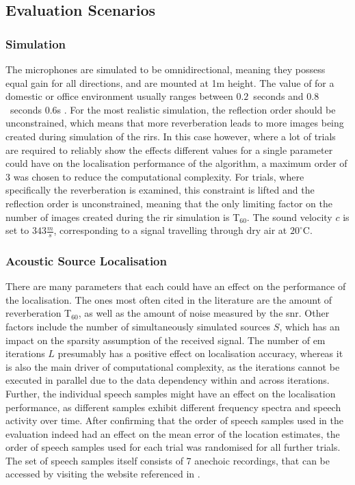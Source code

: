 \subsection{Evaluation Scenarios}
\subsubsection*{Simulation}
The microphones are simulated to be omnidirectional, meaning they possess equal gain for all directions, and are mounted at 1m height. The value of \Tsixty for a domestic or office environment usually ranges between $0.2$~seconds and $0.8$~seconds 0.6s \cite[p.~695]{Gannot2017}. For the most realistic simulation, the reflection order should be unconstrained, which means that more reverberation leads to more images being created during simulation of the \glspl{rir}. In this case however, where a lot of trials are required to reliably show the effects different values for a single parameter could have on the localisation performance of the algorithm, a maximum order of 3 was chosen to reduce the computational complexity. For trials, where specifically the reverberation is examined, this constraint is lifted and the reflection order is unconstrained, meaning that the only limiting factor on the number of images created during the \gls{rir} simulation is T$_{60}$. The sound velocity $c$ is set to $343\frac{m}{s}$, corresponding to a signal travelling through dry air at $20^{\circ}$C.

\subsubsection*{Acoustic Source Localisation}
\label{sec:evalScenariosLoc}
There are many parameters that each could have an effect on the performance of the localisation. The ones most often cited in the literature are the amount of reverberation T$_{60}$, as well as the amount of noise measured by the \gls{snr}. Other factors include the number of simultaneously simulated sources $S$, which has an impact on the sparsity assumption of the received signal. The number of \gls{em} iterations $L$ presumably has a positive effect on localisation accuracy, whereas it is also the main driver of computational complexity, as the iterations cannot be executed in parallel due to the data dependency within and across iterations. Further, the individual speech samples might have an effect on the localisation performance, as different samples exhibit different frequency spectra and speech activity over time. After confirming that the order of speech samples used in the evaluation indeed had an effect on the mean error of the location estimates, the order of speech samples used for each trial was randomised for all further trials. The set of speech samples itself consists of 7 anechoic recordings, that can be accessed by visiting the website referenced in \cite{Mainczyk2017}.


